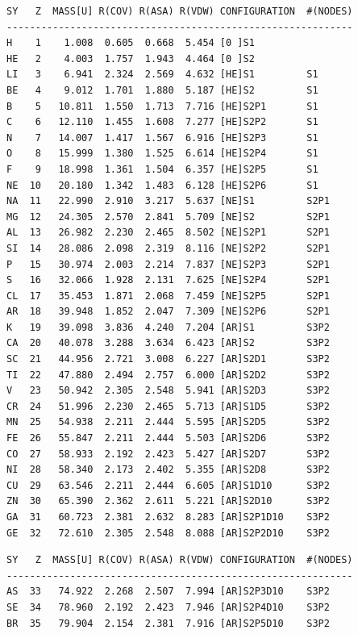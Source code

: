 \documentclass[final,12pt]{article}
\begin{document}
{{{{{{\small
\begin{verbatim}
SY   Z  MASS[U] R(COV) R(ASA) R(VDW) CONFIGURATION  #(NODES)
------------------------------------------------------------
H    1    1.008  0.605  0.668  5.454 [0 ]S1                   
HE   2    4.003  1.757  1.943  4.464 [0 ]S2                   
LI   3    6.941  2.324  2.569  4.632 [HE]S1         S1        
BE   4    9.012  1.701  1.880  5.187 [HE]S2         S1        
B    5   10.811  1.550  1.713  7.716 [HE]S2P1       S1        
C    6   12.110  1.455  1.608  7.277 [HE]S2P2       S1        
N    7   14.007  1.417  1.567  6.916 [HE]S2P3       S1        
O    8   15.999  1.380  1.525  6.614 [HE]S2P4       S1        
F    9   18.998  1.361  1.504  6.357 [HE]S2P5       S1        
NE  10   20.180  1.342  1.483  6.128 [HE]S2P6       S1        
NA  11   22.990  2.910  3.217  5.637 [NE]S1         S2P1      
MG  12   24.305  2.570  2.841  5.709 [NE]S2         S2P1      
AL  13   26.982  2.230  2.465  8.502 [NE]S2P1       S2P1      
SI  14   28.086  2.098  2.319  8.116 [NE]S2P2       S2P1      
P   15   30.974  2.003  2.214  7.837 [NE]S2P3       S2P1      
S   16   32.066  1.928  2.131  7.625 [NE]S2P4       S2P1      
CL  17   35.453  1.871  2.068  7.459 [NE]S2P5       S2P1      
AR  18   39.948  1.852  2.047  7.309 [NE]S2P6       S2P1      
K   19   39.098  3.836  4.240  7.204 [AR]S1         S3P2      
CA  20   40.078  3.288  3.634  6.423 [AR]S2         S3P2      
SC  21   44.956  2.721  3.008  6.227 [AR]S2D1       S3P2      
TI  22   47.880  2.494  2.757  6.000 [AR]S2D2       S3P2      
V   23   50.942  2.305  2.548  5.941 [AR]S2D3       S3P2      
CR  24   51.996  2.230  2.465  5.713 [AR]S1D5       S3P2      
MN  25   54.938  2.211  2.444  5.595 [AR]S2D5       S3P2      
FE  26   55.847  2.211  2.444  5.503 [AR]S2D6       S3P2      
CO  27   58.933  2.192  2.423  5.427 [AR]S2D7       S3P2      
NI  28   58.340  2.173  2.402  5.355 [AR]S2D8       S3P2      
CU  29   63.546  2.211  2.444  6.605 [AR]S1D10      S3P2      
ZN  30   65.390  2.362  2.611  5.221 [AR]S2D10      S3P2      
GA  31   60.723  2.381  2.632  8.283 [AR]S2P1D10    S3P2      
GE  32   72.610  2.305  2.548  8.088 [AR]S2P2D10    S3P2      
\end{verbatim}
\newpage
\begin{verbatim}
SY   Z  MASS[U] R(COV) R(ASA) R(VDW) CONFIGURATION  #(NODES)
------------------------------------------------------------
AS  33   74.922  2.268  2.507  7.994 [AR]S2P3D10    S3P2      
SE  34   78.960  2.192  2.423  7.946 [AR]S2P4D10    S3P2      
BR  35   79.904  2.154  2.381  7.916 [AR]S2P5D10    S3P2      

\end{verbatim}}}}}}}
\end{document}
